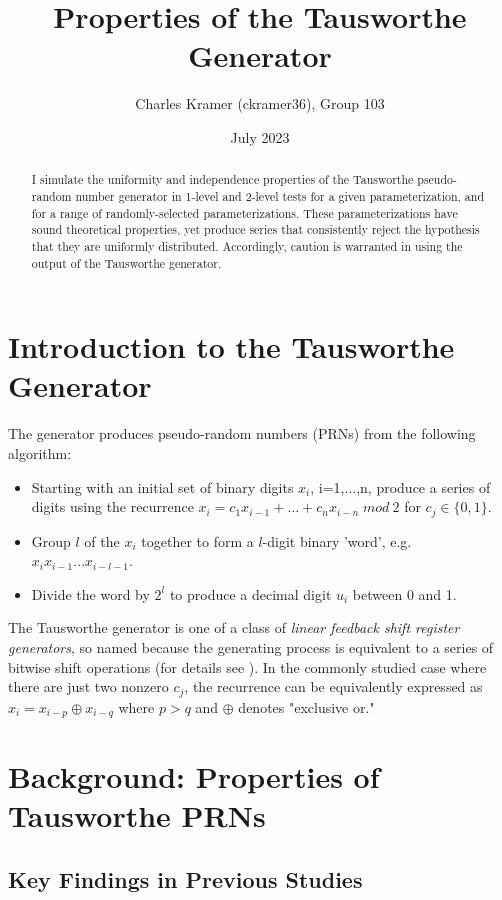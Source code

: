 \documentclass[12pt]{amsart}
\title{}
\title{Properties of the Tausworthe Generator}
\author{Charles Kramer (ckramer36), Group 103}
\date{July 2023}
\begin{document}
\begin{abstract}
I simulate the uniformity and independence properties of the Tausworthe pseudo-random number generator in 1-level and 2-level tests for a given parameterization, and for a range of randomly-selected parameterizations. These parameterizations have sound theoretical properties, yet produce series that consistently reject the hypothesis that they are uniformly distributed. Accordingly, caution is warranted in using the output of the Tausworthe generator.   
\end{abstract}
\maketitle


\section{Introduction to the Tausworthe Generator}

The \cite{Tausworthe} generator produces pseudo-random numbers (PRNs) from the following algorithm:

\begin{itemize}
\item Starting with an initial set of binary digits {$x_i$, i=1,...,n}, produce a series of digits using the recurrence $x_i = c_1 x_{i-1} +\ldots+ c_n x_{i-n} \; mod \: 2$ for ${c_j}  \in \{0,1\}$.
\item Group $l$ of the $x_i$ together to form a $l$-digit binary 'word', e.g. $x_ix_{i-1} \ldots x_{i-l-1}.$
\item Divide the word by $2^l$ to produce a decimal digit $u_i$ between 0 and 1. \\
\end{itemize}
The Tausworthe generator is one of a class of \textit{linear feedback shift register generators}, so named because the generating process is equivalent to a series of bitwise shift operations (for details see \cite{CampLewis}). In the commonly studied case where there are just two nonzero $c_j$, the recurrence can be equivalently expressed as $x_i = x_{i-p} \oplus x_{i-q}  $ where $p>q$ and $\oplus$ denotes "exclusive or."   

\section{Background: Properties of Tausworthe PRNs}

\subsection{Key Findings in Previous Studies}
\end{document}
